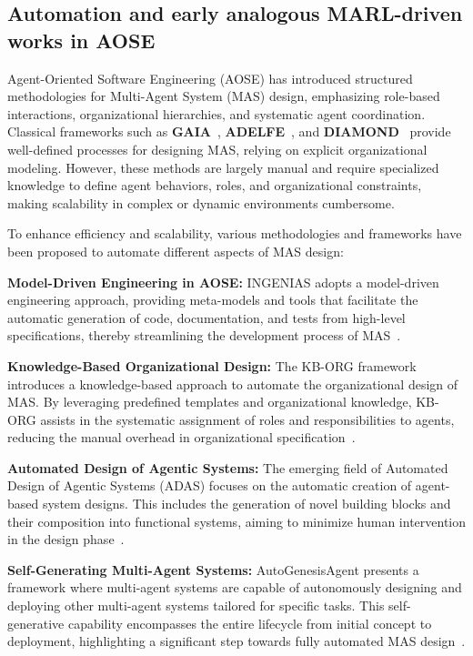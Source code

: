 \documentclass[pdflatex,sn-mathphys-num]{sn-jnl}%
\theoremstyle{thmstyleone}%
\theoremstyle{thmstyletwo}%
\theoremstyle{thmstylethree}%
\begin{document}
\subsection{Automation and early analogous MARL-driven works in AOSE}\label{sub-sec:rel_aose_automate_marl}

Agent-Oriented Software Engineering (AOSE) has introduced structured methodologies for Multi-Agent System (MAS) design, emphasizing role-based interactions, organizational hierarchies, and systematic agent coordination. Classical frameworks such as \textbf{GAIA}~\cite{gaia1998}, \textbf{ADELFE}~\cite{adelfe2002}, and \textbf{DIAMOND}~\cite{Jamont2005} provide well-defined processes for designing MAS, relying on explicit organizational modeling. However, these methods are largely manual and require specialized knowledge to define agent behaviors, roles, and organizational constraints, making scalability in complex or dynamic environments cumbersome.

To enhance efficiency and scalability, various methodologies and frameworks have been proposed to automate different aspects of MAS design:

\textbf{Model-Driven Engineering in AOSE:} INGENIAS adopts a model-driven engineering approach, providing meta-models and tools that facilitate the automatic generation of code, documentation, and tests from high-level specifications, thereby streamlining the development process of MAS~\cite{pavon2005agent}.
          
\textbf{Knowledge-Based Organizational Design:} The KB-ORG framework introduces a knowledge-based approach to automate the organizational design of MAS. By leveraging predefined templates and organizational knowledge, KB-ORG assists in the systematic assignment of roles and responsibilities to agents, reducing the manual overhead in organizational specification~\cite{dignum2001kb}.
          
\textbf{Automated Design of Agentic Systems:} The emerging field of Automated Design of Agentic Systems (ADAS) focuses on the automatic creation of agent-based system designs. This includes the generation of novel building blocks and their composition into functional systems, aiming to minimize human intervention in the design phase~\cite{smith2024automated}.
          
\textbf{Self-Generating Multi-Agent Systems:} AutoGenesisAgent presents a framework where multi-agent systems are capable of autonomously designing and deploying other multi-agent systems tailored for specific tasks. This self-generative capability encompasses the entire lifecycle from initial concept to deployment, highlighting a significant step towards fully automated MAS design~\cite{harper2024autogenesisagent}.
          
\end{document}
